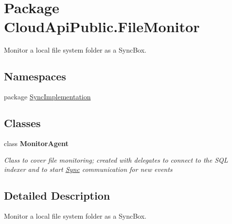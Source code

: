 \hypertarget{namespace_cloud_api_public_1_1_file_monitor}{\section{Package Cloud\-Api\-Public.\-File\-Monitor}
\label{namespace_cloud_api_public_1_1_file_monitor}
}


Monitor a local file system folder as a Sync\-Box.  


\subsection*{Namespaces}
\begin{DoxyCompactItemize}
\item 
package \hyperlink{namespace_cloud_api_public_1_1_file_monitor_1_1_sync_implementation}{Sync\-Implementation}
\end{DoxyCompactItemize}
\subsection*{Classes}
\begin{DoxyCompactItemize}
\item 
class {\bfseries Monitor\-Agent}
\begin{DoxyCompactList}\small\item\em Class to cover file monitoring; created with delegates to connect to the S\-Q\-L indexer and to start \hyperlink{namespace_cloud_api_public_1_1_sync}{Sync} communication for new events \end{DoxyCompactList}\end{DoxyCompactItemize}


\subsection{Detailed Description}
Monitor a local file system folder as a Sync\-Box. 